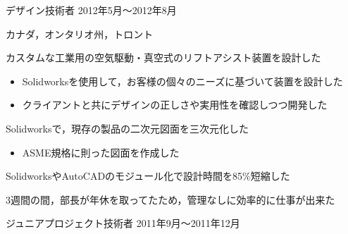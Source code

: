 \documentclass[10pt, a4paper]{article}
\begin{document}
\begin{outerlist}
\item[\href{http://starquip.com/}{\parbox[t]{3cm}{\raggedleft Starquip Integrated Systems有限会社}}]{デザイン技術者} \hfill {2012年5月〜2012年8月}

\vspace{-\baselineskip}    
\hfill カナダ，オンタリオ州，トロント

  \begin{innerlist}
  \item カスタムな工業用の空気駆動・真空式のリフトアシスト装置を設計した
  \begin{itemize}
    \item Solidworksを使用して，お客様の個々のニーズに基づいて装置を設計した
    \item クライアントと共にデザインの正しさや実用性を確認しつつ開発した
  \end{itemize}
  \item Solidworksで，現存の製品の二次元図面を三次元化した
  \begin{itemize}
  \item ASME規格に則った図面を作成した
  \end{itemize}
  \item SolidworksやAutoCADのモジュール化で設計時間を85\%短縮した
  \item 3週間の間，部長が年休を取ってたため，管理なしに効率的に仕事が出来た
  \end{innerlist}

\item[\href{http://www.kqbikes.com/}{\parbox[t]{3cm}{\raggedleft Kevin Quan Studios有限会社}}]{ジュニアプロジェクト技術者} \hfill {2011年9月〜2011年12月}


\end{outerlist}
\end{document}
